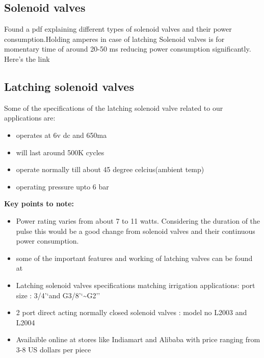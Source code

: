 \documentclass[16pt]{article}
\begin{document}




\subsection{Solenoid valves}

\vspace{0.3cm}

  Found a pdf explaining different types of solenoid valves and their
  power consumption.Holding amperes in case of latching Solenoid valves is
  for momentary time of around 20-50 ms reducing power consumption
  significantly. Here's the link %

\vspace{0.3cm}

\subsection{Latching solenoid valves}

  Some of the specifications of the latching solenoid valve related to our
  applications are:
  
  \begin{itemize}

  \item
    operates at 6v dc and 650ma
  \item
    will last around 500K cycles
  \item
    operate normally till about 45 degree celcius(ambient temp)
  \item
    operating pressure upto 6 bar
  \end{itemize}
  
\vspace{0.4cm}

  \textbf{Key points to note:}

  \begin{itemize}

  \item
    Power rating varies from about 7 to 11 watts. Considering the duration
    of the pulse this would be a good change from solenoid valves and
    their continuous power consumption.
  \item
    some of the important features and working of latching valves can be
    found at
    
  \item
    Latching solenoid valves specifications matching irrigation
    applications: port size : 3/4'`and G3/8'`\textasciitilde{}G2''
  \item
    2 port direct acting normally closed solenoid valves : model no L2003
    and L2004
  \item
    Availaible online at stores like Indiamart and Alibaba with price
    ranging from 3-8 US dollars per piece
  \end{itemize}
\end{document}
